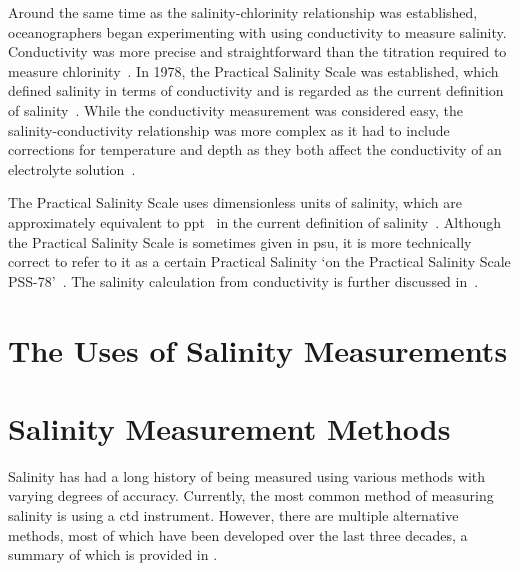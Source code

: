 Around the same time as the salinity-chlorinity relationship was established, oceanographers began experimenting with using conductivity to measure salinity.
Conductivity was more precise and straightforward than the titration required to measure chlorinity~\cite{lewis_salinity_definition_and_calculation_1978}.
In 1978, the Practical Salinity Scale was established, which defined salinity in terms of conductivity and is regarded as the current definition of salinity~\cite{lewis_salinity_definition_and_calculation_1978}.
While the conductivity measurement was considered easy, the salinity-conductivity relationship was more complex as it had to include corrections for temperature and depth as they both affect the conductivity of an electrolyte solution~\cite{zheng_electrical_conductivity_of_ocean_2017}.

The Practical Salinity Scale uses dimensionless units of salinity, which are approximately equivalent to \gls{ppt}~\cite{seabird_ppt_vs_psu_2024} in the current definition of salinity~\cite{ioc_teos_2010}.
Although the Practical Salinity Scale is sometimes given in \gls{psu}, it is more technically correct to refer to it as a certain Practical Salinity `on the Practical Salinity Scale PSS-78'~\cite{lewis_salinity_definition_and_calculation_1978}.
The salinity calculation from conductivity is further discussed in~.

\section{The Uses of Salinity Measurements}\label{sec:the-uses-of-salinity-measurements}

\section{Salinity Measurement Methods}\label{sec:salinity-measurement-techniques}

Salinity has had a long history of being measured using various methods with varying degrees of accuracy.
Currently, the most common method of measuring salinity is using a \gls{ctd} instrument. 
However, there are multiple alternative methods, most of which have been developed over the last three decades, a summary of which is provided in .

